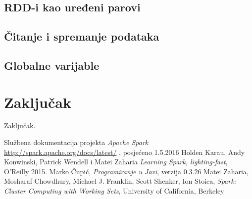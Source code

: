 \documentclass[times, utf8, zavrsni, numeric]{fer}
\begin{document}
\section{RDD-i kao uređeni parovi}
\section{Čitanje i spremanje podataka}
\section{Globalne varijable}
\chapter{Zaključak} 
Zaključak.


\begin{thebibliography}{9}
  Službena dokumentacija projekta \emph{Apache Spark} \url{http://spark.apache.org/docs/latest/} , posjećeno 1.5.2016
  Holden Karau, Andy Konwinski, Patrick Wendell i Matei Zaharia
  \emph{Learning Spark, lighting-fast}, O'Reilly 2015.
  Marko Čupić,
  \emph{Programiranje u Javi},
  verzija 0.3.26
  Matei Zaharia, Mosharaf Chowdhury, Michael J. Franklin, Scott Shenker, Ion Stoica,
  \emph{Spark: Cluster Computing with Working Sets}, University of California, Berkeley
\end{thebibliography}
\end{document}
